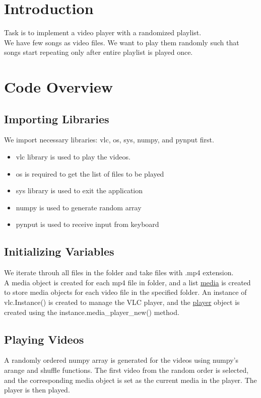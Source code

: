 \documentclass[journal,12pt,twocolumn]{IEEEtran}
\begin{document}
\maketitle

\newpage
\bigskip
\renewcommand{\thefigure}{\theenumi}
\renewcommand{\thetable}{\theenumi}


\section{Introduction}
Task is to implement a video player with a randomized playlist.\\
We have few songs as video files. We want to play them randomly such that songs start repeating only after entire playlist is played once.

\section{Code Overview}

\subsection{Importing Libraries}
We import necessary libraries: vlc, os, sys, numpy, and pynput first.
\begin{itemize}
\item vlc library is used to play the videos.
\item os is required to get the list of files to be played
\item sys library is used to exit the application
\item numpy is used to generate random array
\item pynput is used to receive input from keyboard
\end{itemize}


\subsection{Initializing Variables}
We iterate throuh all files in the folder and take files with .mp4 extension.\\
A media object is created for each mp4 file in folder, and a list \underline{media} is created to store media objects for each video file in the specified folder.
An instance of vlc.Instance() is created to manage the VLC player, and the \underline{player} object is created using the instance.media\_player\_new() method.

\subsection{Playing Videos}
A randomly ordered numpy array is generated for the videos using numpy's arange and shuffle functions. The first video from the random order is selected, and the corresponding media object is set as the current media in the player. The player is then played.
\end{document}
